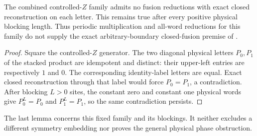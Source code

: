 \begin{lemma}
    \label{lem:mpug_controlled_z_no_closed_fusion}
    \leanok
    The combined controlled-$Z$ family admits no fusion reductions with
    exact closed reconstruction on each letter. This remains true after
    every positive physical blocking length. Thus periodic multiplication
    and all-word reductions for this family do not supply the exact
    arbitrary-boundary closed-fusion premise of
    \cite[equation \texttt{fusiontensorG}]{GarreRubio2023MPOSym}.
\end{lemma}
\begin{proof}\leanok
    Square the controlled-$Z$ generator. The two diagonal physical letters
    $P_0,P_1$ of the stacked product are idempotent and distinct: their
    upper-left entries are respectively $1$ and $0$. The corresponding
    identity-label letters are equal. Exact closed reconstruction through
    that label would force $P_0=P_1$, a contradiction. After blocking $L>0$
    sites, the constant zero and constant one physical words give
    $P_0^L=P_0$ and $P_1^L=P_1$, so the same contradiction persists.
\end{proof}

The last lemma concerns this fixed family and its blockings. It neither
excludes a different symmetry embedding nor proves the general physical
phase obstruction.
